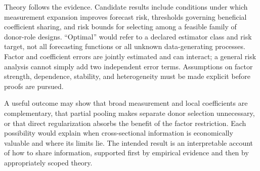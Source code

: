 \documentclass[11pt]{article}
\begin{document}
Theory follows the evidence. Candidate results include conditions under which measurement expansion improves forecast risk, thresholds governing beneficial coefficient sharing, and risk bounds for selecting among a feasible family of donor-role designs. ``Optimal'' would refer to a declared estimator class and risk target, not all forecasting functions or all unknown data-generating processes. Factor and coefficient errors are jointly estimated and can interact; a general risk analysis cannot simply add two independent error terms. Assumptions on factor strength, dependence, stability, and heterogeneity must be made explicit before proofs are pursued.

A useful outcome may show that broad measurement and local coefficients are complementary, that partial pooling makes separate donor selection unnecessary, or that direct regularization absorbs the benefit of the factor restriction. Each possibility would explain when cross-sectional information is economically valuable and where its limits lie. The intended result is an interpretable account of how to share information, supported first by empirical evidence and then by appropriately scoped theory.

\begingroup
\small
\setlength{\bibsep}{3pt}


\endgroup
\end{document}
